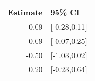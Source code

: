 \begin{tabular}{rl}
  \hline
Estimate & 95\% CI \\ 
  \hline
-0.09 & [-0.28,0.11] \\ 
  0.09 & [-0.07,0.25] \\ 
  -0.50 & [-1.03,0.02] \\ 
  0.20 & [-0.23,0.64] \\ 
   \hline
\end{tabular}

